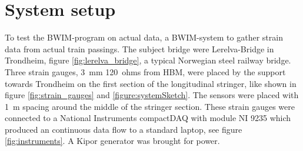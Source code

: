 \section{System setup}
\label{system_setup}
To test the BWIM-program on actual data,  a BWIM-system to gather strain data from actual train passings. The subject bridge were Lerelva-Bridge in Trondheim, figure \ref{fig:lerelva_bridge}, a typical Norwegian steel railway bridge. Three strain gauges, \SI{3}{\mm} \SI{120}{ohms} from HBM, were placed by the support towards Trondheim on the first section of the longitudinal stringer, like shown in figure \ref{fig:strain_gauges} and \ref{figure:systemSketch}. The sensors were placed with \SI{1}{\m} spacing around the middle of the stringer section. These strain gauges were connected to a National Instruments compactDAQ with module NI 9235 which produced an continuous data flow to a standard laptop, see figure \ref{fig:instruments}. A Kipor generator was brought for power.
